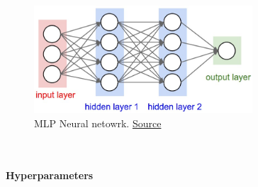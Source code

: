 \documentclass[11pt,a4paper,english]{article}
\begin{document}
\begin{figure}[H]
  \centering
  \includegraphics[height=4cm]{res/neural_net2.jpeg}
  \caption{MLP Neural netowrk. \href{http://cs231n.github.io/neural-networks-1/}{Source}}
  \label{fig:neural_net2}
\end{figure}



\noindent \\
\noindent \\ \textbf{Hyperparameters}
\end{document}
